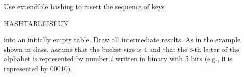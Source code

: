 Use extendible hashing to insert the sequence of keys {\tt

HASHTABLEISFUN} into an initially empty table.  Draw all intermediate
results.  As in the example shown in class, assume that the bucket size
is 4 and that the $i$-th letter of the alphabet is represented by
number $i$ written in binary with 5 bits (e.g., {\tt B} is represented
by 00010).
